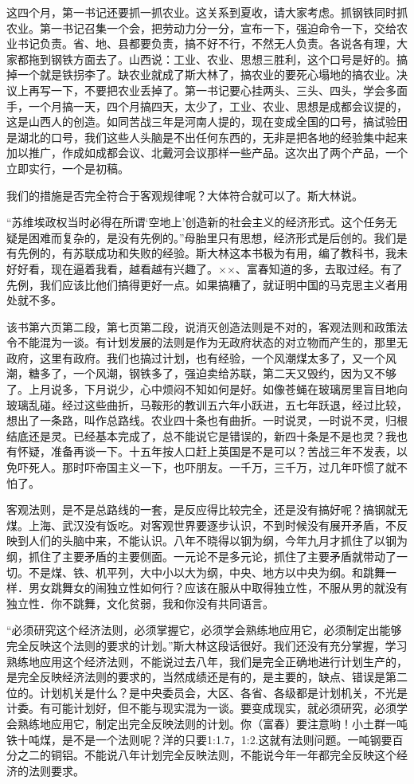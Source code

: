 这四个月，第一书记还要抓一抓农业。这关系到夏收，请大家考虑。抓钢铁同时抓农业。第一书记召集一个会，把劳动力分一分，宣布一下，强迫命令一下，交给农业书记负责。省、地、县都要负责，搞不好不行，不然无人负责。各说各有理，大家都拖到钢铁方面去了。山西说：工业、农业、思想三胜利，这个口号是好的。搞掉一个就是铁拐李了。缺农业就成了斯大林了，搞农业的要死心塌地的搞农业。决议上再写一下，不要把农业丢掉了。第一书记要心挂两头、三头、四头，学会多面手，一个月搞一天，四个月搞四天，太少了，工业、农业、思想是成都会议提的，这是山西人的创造。如同苦战三年是河南人提的，现在变成全国的口号，搞试验田是湖北的口号，我们这些人头脑是不出任何东西的，无非是把各地的经验集中起来加以推广，作成如成都会议、北戴河会议那样一些产品。这次出了两个产品，一个立即实行，一个是初稿。

我们的措施是否完全符合于客观规律呢？大体符合就可以了。斯大林说。

“苏维埃政权当时必得在所谓‘空地上’创造新的社会主义的经济形式。这个任务无疑是困难而复杂的，是没有先例的。”母胎里只有思想，经济形式是后创的。我们是有先例的，有苏联成功和失败的经验。斯大林这本书极为有用，编了教科书，我未好好看，现在逼着我看，越看越有兴趣了。××、富春知道的多，去取过经。有了先例，我们应该比他们搞得更好一点。如果搞糟了，就证明中国的马克思主义者用处就不多。

该书第六页第二段，第七页第二段，说消灭创造法则是不对的，客观法则和政策法令不能混为一谈。有计划发展的法则是作为无政府状态的对立物而产生的，那里无政府，这里有政府。我们也搞过计划，也有经验，一个风潮煤太多了，又一个风潮，糖多了，一个风潮，钢铁多了，强迫卖给苏联，第二天又毁约，因为又不够了。上月说多，下月说少，心中烦闷不知如何是好。如像苍蝇在玻璃房里盲目地向玻璃乱碰。经过这些曲折，马鞍形的教训五六年小跃进，五七年跃退，经过比较，想出了一条路，叫作总路线。农业四十条也有曲折。一时说灵，一时说不灵，归根结底还是灵。已经基本完成了，总不能说它是错误的，新四十条是不是也灵？我也有怀疑，准备再谈一下。十五年按人口赶上英国是不是可以？苦战三年不发表，以免吓死人。那时吓帝国主义一下，也吓朋友。一千万，三千万，过几年吓惯了就不怕了。

客观法则，是不是总路线的一套，是反应得比较完全，还是没有搞好呢？搞钢就无煤。上海、武汉没有饭吃。对客观世界要逐步认识，不到时候没有展开矛盾，不反映到人们的头脑中来，不能认识。八年不晓得以钢为纲，今年九月才抓住了以钢为纲，抓住了主要矛盾的主要侧面。一元论不是多元论，抓住了主要矛盾就带动了一切。不是煤、铁、机平列，大中小以大为纲，中央、地方以中央为纲。和跳舞一样．男女跳舞女的闹独立性如何行？应该在服从中取得独立性，不服从男的就没有独立性．你不跳舞，文化贫弱，我和你没有共同语言。

“必须研究这个经济法则，必须掌握它，必须学会熟练地应用它，必须制定出能够完全反映这个法则的要求的计划。”斯大林这段话很好。我们还没有充分掌握，学习熟练地应用这个经济法则，不能说过去八年，我们是完全正确地进行计划生产的，是完全反映经济法则的要求的，当然成绩还是有的，是主要的，缺点、错误是第二位的。计划机关是什么？是中央委员会，大区、各省、各级都是计划机关，不光是计委。有可能计划好，但不能与现实混为一谈。要变成现实，就必须研究，必须学会熟练地应用它，制定出完全反映法则的计划。你（富春）要注意哟！小土群一吨铁十吨煤，是不是一个法则呢？洋的只要1:1.7，1:2.这就有法则问题。一吨钢要百分之二的铜铝。不能说八年计划完全反映法则，不能说今年一年都完全反映这个经济的法则要求。

